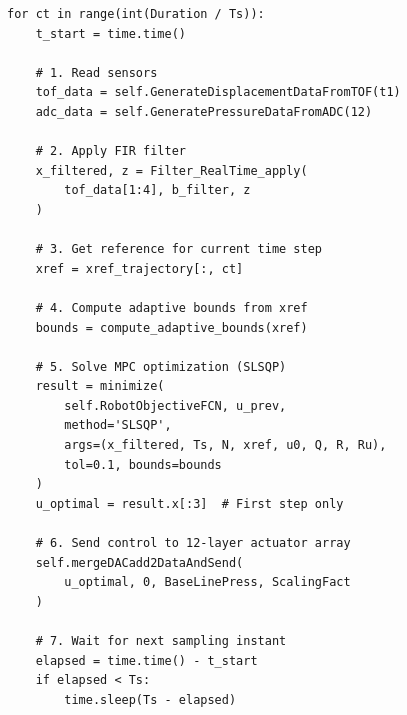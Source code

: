 \documentclass[11pt,a4paper]{article}
\begin{document}
\begin{center}
\end{center}

\begin{codebox}
\begin{lstlisting}
for ct in range(int(Duration / Ts)):
    t_start = time.time()

    # 1. Read sensors
    tof_data = self.GenerateDisplacementDataFromTOF(t1)
    adc_data = self.GeneratePressureDataFromADC(12)

    # 2. Apply FIR filter
    x_filtered, z = Filter_RealTime_apply(
        tof_data[1:4], b_filter, z
    )

    # 3. Get reference for current time step
    xref = xref_trajectory[:, ct]

    # 4. Compute adaptive bounds from xref
    bounds = compute_adaptive_bounds(xref)

    # 5. Solve MPC optimization (SLSQP)
    result = minimize(
        self.RobotObjectiveFCN, u_prev,
        method='SLSQP',
        args=(x_filtered, Ts, N, xref, u0, Q, R, Ru),
        tol=0.1, bounds=bounds
    )
    u_optimal = result.x[:3]  # First step only

    # 6. Send control to 12-layer actuator array
    self.mergeDACadd2DataAndSend(
        u_optimal, 0, BaseLinePress, ScalingFact
    )

    # 7. Wait for next sampling instant
    elapsed = time.time() - t_start
    if elapsed < Ts:
        time.sleep(Ts - elapsed)
\end{lstlisting}
\end{codebox}
\end{document}
